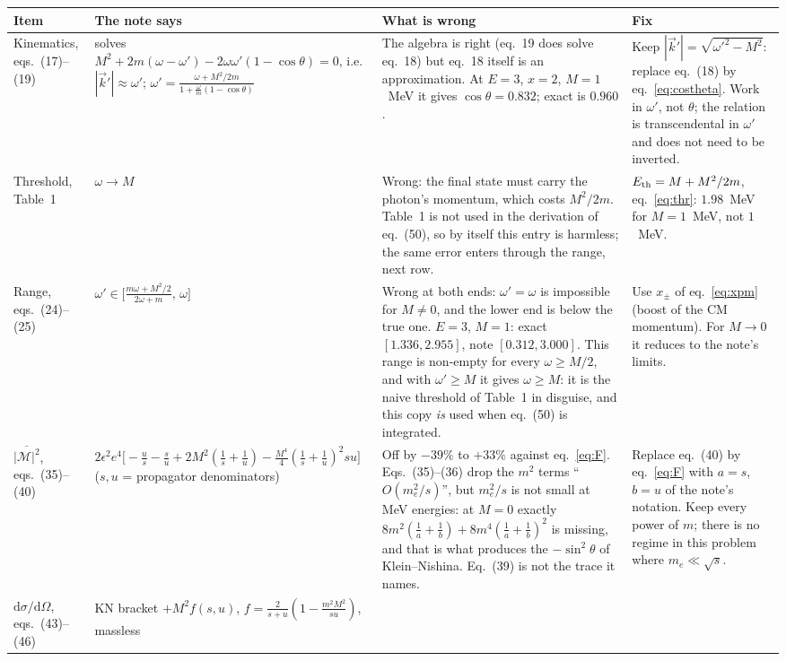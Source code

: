 \documentclass[11pt,a4paper]{article}
\newcommand{\eps}{\epsilon}
\newcommand{\dd}{\mathrm{d}}
\begin{document}
{\small
\begin{longtable}{@{}p{2.3cm}p{4.2cm}p{3.9cm}p{4.6cm}@{}}
\toprule
Item & The note says & What is wrong & Fix \\
\midrule
\endhead
Kinematics, eqs.~(17)--(19) & solves $M^2+2m(\omega-\omega')-2\omega\omega'(1-\cos\theta)=0$, i.e.\ $|\vec k'|\approx\omega'$;
$\omega'=\frac{\omega+M^2/2m}{1+\frac{\omega}{m}(1-\cos\theta)}$ &
The algebra is right (eq.~19 does solve eq.~18) but eq.~18 itself is an approximation. At $E=3$, $x=2$, $M=1$~MeV it gives
$\cos\theta=0.832$; exact is $0.960$. &
Keep $|\vec k'|=\sqrt{\omega'^2-M^2}$: replace eq.~(18) by eq.~\eqref{eq:costheta}. Work in $\omega'$, not $\theta$; the
relation is transcendental in $\omega'$ and does not need to be inverted.\\
Threshold, Table~1 & $\omega\to M$ & Wrong: the final state must carry the photon's momentum, which costs $M^2/2m$.
Table~1 is not used in the derivation of eq.~(50), so by itself this entry is harmless; the same error enters through
the range, next row. & $E_{\rm th}=M+M^2/2m$, eq.~\eqref{eq:thr}: $1.98$~MeV for $M=1$~MeV, not $1$~MeV.\\
Range, eqs.~(24)--(25) & $\omega'\in\big[\frac{m\omega+M^2/2}{2\omega+m},\,\omega\big]$ &
Wrong at both ends: $\omega'=\omega$ is impossible for $M\neq0$, and the lower end is below the true one.
$E=3$, $M=1$: exact $[1.336,2.955]$, note $[0.312,3.000]$. This range is non-empty for every $\omega\ge M/2$, and with
$\omega'\ge M$ it gives $\omega\ge M$: it is the naive threshold of Table~1 in disguise, and this copy \emph{is} used
when eq.~(50) is integrated. &
Use $x_\pm$ of eq.~\eqref{eq:xpm} (boost of the CM momentum). For $M\to0$ it reduces to the note's limits.\\
$\overline{|\mathcal M|^2}$, eqs.~(35)--(40) & $2\eps^2e^4\big[-\frac us-\frac su+2M^2(\frac1s+\frac1u)-\frac{M^4}{4}(\frac1s+\frac1u)^2su\big]$
($s,u$ = propagator denominators) &
Off by $-39\%$ to $+33\%$ against eq.~\eqref{eq:F}. Eqs.~(35)--(36) drop the $m^2$ terms ``$O(m_e^2/s)$'', but
$m_e^2/s$ is not small at MeV energies: at $M=0$ exactly $8m^2(\frac1a+\frac1b)+8m^4(\frac1a+\frac1b)^2$ is missing, and
that is what produces the $-\sin^2\theta$ of Klein--Nishina. Eq.~(39) is not the trace it names. &
Replace eq.~(40) by eq.~\eqref{eq:F} with $a=s$, $b=u$ of the note's notation. Keep every power of $m$; there is no
regime in this problem where $m_e\ll\sqrt s$.\\
$\dd\sigma/\dd\Omega$, eqs.~(43)--(46) & KN bracket $+M^2 f(s,u)$, $f=\frac{2}{s+u}(1-\frac{m^2M^2}{su})$, massless

\end{longtable}}
\end{document}
